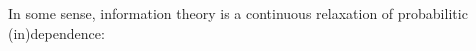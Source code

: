 {%
In some sense, information theory is a continuous relaxation of probabilitic (in)dependence:
%
%
}
